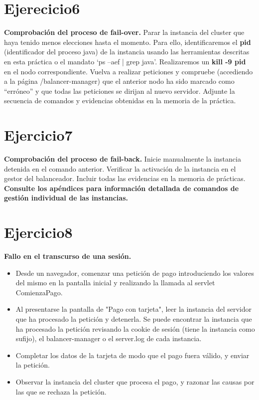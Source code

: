\documentclass[a4paper, 10pt]{article}
\begin{document}
\section{Ejerecicio6}
\begin{mdframed}
	\textbf{Comprobación del proceso de fail-over.} Parar la instancia del cluster que haya tenido
	menos elecciones hasta el momento. Para ello, identificaremos el \textbf{pid} (identificador del proceso java) de la
	instancia usando las herramientas descritas en esta práctica o el mandato ‘ps –aef | grep java’.
	Realizaremos un \textbf{kill -9 pid} en el nodo correspondiente. Vuelva a realizar peticiones y compruebe
	(accediendo a la página /balancer-manager) que el anterior nodo ha sido marcado como “erróneo” y que
	todas las peticiones se dirijan al nuevo servidor. Adjunte la secuencia de comandos y evidencias obtenidas
	en la memoria de la práctica. 
\end{mdframed}

\section{Ejercicio7}
\begin{mdframed}
	 \textbf{Comprobación del proceso de fail-back.} Inicie manualmente la instancia detenida en el
	 comando anterior. Verificar la activación de la instancia en el gestor del balanceador. Incluir todas las
	 evidencias en la memoria de prácticas. \textbf{Consulte los apéndices para información detallada de
	 comandos de gestión individual de las instancias.}
\end{mdframed}

\section{Ejercicio8}
\begin{mdframed}
	 \textbf{Fallo en el transcurso de una sesión.}
	 \begin{itemize}
	  \item Desde un navegador, comenzar una petición de pago introduciendo los valores del mismo en la
	  pantalla inicial y realizando la llamada al servlet ComienzaPago.
	  \item Al presentarse la pantalla de "Pago con tarjeta", leer la instancia del servidor que ha procesado la
	  petición y detenerla. Se puede encontrar la instancia que ha procesado la petición revisando la
	  cookie de sesión (tiene la instancia como sufijo), el balancer-manager o el server.log de cada
	  instancia.
	  \item Completar los datos de la tarjeta de modo que el pago fuera válido, y enviar la petición.
	  \item Observar la instancia del cluster que procesa el pago, y razonar las causas por las que se rechaza
	  la petición. 	
	 \end{itemize}
	
\end{mdframed}
\end{document}
